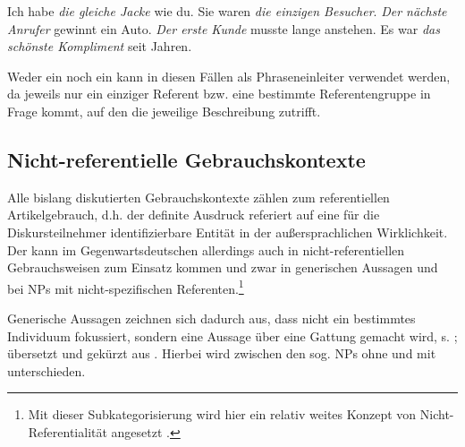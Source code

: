  \begin{exe}
	\ex \label{ex:mod}   
	\begin{xlist}
		\ex \label{ex:same} Ich habe \textit{die gleiche Jacke} wie du.
		\ex \label{ex:only} Sie waren \textit{die einzigen Besucher}.   
		\ex \label{ex:next} \textit{Der nächste Anrufer} gewinnt ein Auto. 
		\ex \label{ex:first} \textit{Der erste Kunde} musste lange anstehen.  
		\ex \label{ex:super} Es war \textit{das schönste Kompliment} seit Jahren.
		\end{xlist}
\end{exe}

Weder ein  noch ein  kann in diesen Fällen als Phraseneinleiter  verwendet werden, da jeweils nur ein einziger Referent bzw. eine bestimmte Referentengruppe in Frage kommt, auf den die jeweilige Beschreibung zutrifft.  

\subsection{Nicht-referentielle Gebrauchskontexte}\label{sec:nicht-referentiell}

Alle bislang diskutierten Gebrauchskontexte zählen zum referentiellen  Artikelgebrauch, d.h. der definite Ausdruck referiert auf eine für die Diskursteilnehmer identifizierbare Entität in der außersprachlichen Wirklichkeit.
Der  kann im Gegenwartsdeutschen allerdings auch in nicht-referentiellen  Gebrauchsweisen zum Einsatz kommen und zwar in generischen  Aussagen und bei NPs  mit nicht-spezifischen   Referenten.\footnote{Mit dieser Subkategorisierung wird hier ein relativ weites Konzept von Nicht-Referentialität  angesetzt \parencite[zur Abgrenzungsdiskussion von ,  und  vgl. u.a.][]{Bisle-Muller1991,Lyons1999,Studler2011,vonHeusinger2011}.} 


Generische Aussagen  zeichnen sich dadurch aus, dass nicht ein bestimmtes Individuum fokussiert, sondern eine Aussage über eine Gattung gemacht wird, s. ; übersetzt und gekürzt aus \textcite[]{Krifka1995}. Hierbei wird zwischen den sog.  NPs  ohne und mit  unterschieden.   

